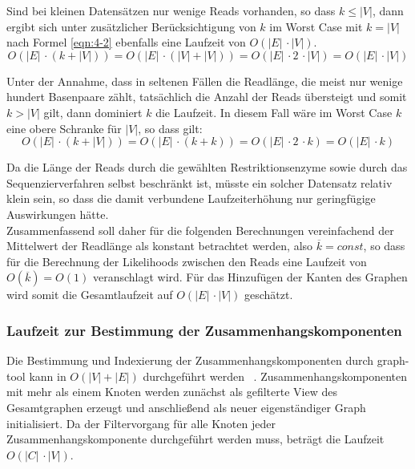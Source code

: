 Sind bei kleinen Datensätzen nur wenige Reads vorhanden, so dass $ k \leq |V| $, dann ergibt sich unter zusätzlicher Berücksichtigung von $k$ im Worst Case mit $ k = |V| $ nach Formel \eqref{eqn:4-2} ebenfalls eine Laufzeit von $O(|E|\, \cdotp |V|) $.
\begin{equation} \label{eqn:4-2}
\tag{4-2}
O(|E|\, \cdotp (k + |V|)) = O(|E|\, \cdotp (|V| + |V|)) = O(|E|\, \cdotp 2 \, \cdotp |V|) = O(|E|\, \cdotp |V|)
\end{equation}

Unter der Annahme, dass in seltenen Fällen die Readlänge, die meist nur wenige hundert Basenpaare zählt, tatsächlich die Anzahl der Reads übersteigt und somit $ k > |V| $ gilt, dann dominiert $k$ die Laufzeit. In diesem Fall wäre im Worst Case $k$ eine obere Schranke für $|V|$, so dass gilt:
\begin{equation} \label{eqn:4-3}
\tag{4-3}
O(|E|\, \cdotp (k + |V|)) = O(|E|\, \cdotp (k + k)) = O(|E|\, \cdotp 2 \, \cdotp k) = O(|E|\, \cdotp k)
\end{equation}

Da die Länge der Reads durch die gewählten Restriktionsenzyme sowie durch das Sequenzierverfahren selbst beschränkt ist, müsste ein solcher Datensatz relativ klein sein, so dass die damit verbundene Laufzeiterhöhung nur geringfügige Auswirkungen hätte. \\

Zusammenfassend soll daher für die folgenden Berechnungen vereinfachend der Mittelwert der Readlänge als konstant betrachtet werden, also $\overline{k}=const$, so dass für die Berechnung der Likelihoods zwischen den Reads eine Laufzeit von $O(\overline{k}) = O(1)$ veranschlagt wird. Für das Hinzufügen der Kanten des Graphen wird somit die Gesamtlaufzeit auf $ O(|E|\, \cdotp |V|) $ geschätzt.\\

\subsubsection{Laufzeit zur Bestimmung der Zusammenhangskomponenten} \label{subsec:}

Die Bestimmung und Indexierung der Zusammenhangskomponenten durch graph-tool kann in $ O(|V| + |E|) $ durchgeführt werden ~\cite{docs_graph_tool}. Zusammenhangskomponenten mit mehr als einem Knoten werden zunächst als gefilterte View des Gesamtgraphen erzeugt und anschließend als neuer eigenständiger Graph initialisiert. Da der Filtervorgang für alle Knoten jeder Zusammenhangskomponente durchgeführt werden muss, beträgt die Laufzeit $ O(|C| \, \cdotp |V|) $. 

